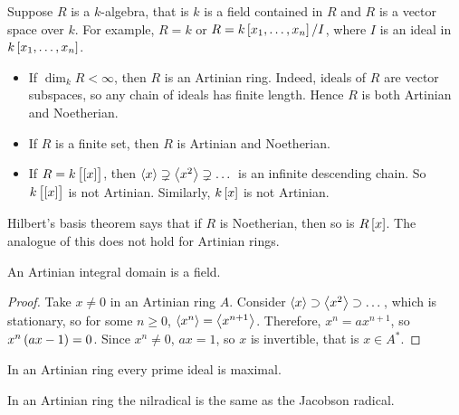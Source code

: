 \pagebreak


\begin{example}
Suppose $ R $ is a $ k $-algebra, that is $ k $ is a field contained in $ R $ and $ R $ is a vector space over $ k $. For example, $ R = k $ or $ R = k\sbr{x_1, \dots, x_n} / I $, where $ I $ is an ideal in $ k\sbr{x_1, \dots, x_n} $.
\begin{itemize}
\item If $ \dim_k R < \infty $, then $ R $ is an Artinian ring. Indeed, ideals of $ R $ are vector subspaces, so any chain of ideals has finite length. Hence $ R $ is both Artinian and Noetherian.
\item If $ R $ is a finite set, then $ R $ is Artinian and Noetherian.
\item If $ R = k\sbr{\sbr{x}} $, then $ \left\langle x \right\rangle \supsetneq \left\langle x^2 \right\rangle \supsetneq \dots $ is an infinite descending chain. So $ k\sbr{\sbr{x}} $ is not Artinian. Similarly, $ k\sbr{x} $ is not Artinian.
\end{itemize}
\end{example}

\begin{remark*}
Hilbert's basis theorem says that if $ R $ is Noetherian, then so is $ R\sbr{x} $. The analogue of this does not hold for Artinian rings.
\end{remark*}

\begin{lemma}
An Artinian integral domain is a field.
\end{lemma}

\begin{proof}
Take $ x \ne 0 $ in an Artinian ring $ A $. Consider $ \left\langle x \right\rangle \supset \left\langle x^2 \right\rangle \supset \dots $, which is stationary, so for some $ n \ge 0 $, $ \left\langle x^n \right\rangle = \left\langle x^{n + 1} \right\rangle $. Therefore, $ x^n = ax^{n + 1} $, so $ x^n\br{ax - 1} = 0 $. Since $ x^n \ne 0 $, $ ax = 1 $, so $ x $ is invertible, that is $ x \in A^* $.
\end{proof}

\begin{corollary}
\label{cor:13.7}
In an Artinian ring every prime ideal is maximal.
\end{corollary}

\begin{corollary}
In an Artinian ring the nilradical is the same as the Jacobson radical.
\end{corollary}


